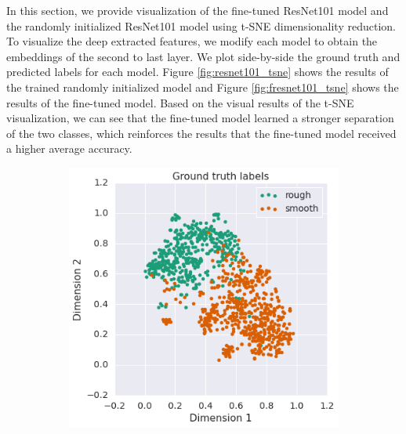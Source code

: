 \documentclass{aci}
\numberwithin{equation}{section}
\begin{document}
In this section, we provide visualization of the fine-tuned ResNet101 model and
the randomly initialized ResNet101 model using t-SNE dimensionality reduction.
To visualize the deep extracted features, we modify each model to obtain the
embeddings of the second to last layer. We plot side-by-side the ground truth
and predicted labels for each model. Figure \ref{fig:resnet101_tsne} shows the
results of the trained randomly initialized model and Figure
\ref{fig:fresnet101_tsne} shows the results of the fine-tuned model. Based on
the visual results of the t-SNE visualization, we can see that the fine-tuned
model learned a stronger separation of the two classes, which reinforces the
results that the fine-tuned model received a higher average accuracy.

\begin{figure}[h!]
    \centering
    \begin{subfigure}{.45\textwidth}
        \includegraphics[width=1\linewidth]{thesis_assets/plots/fresnet101_gt_tsne.png}
    \end{subfigure}
    \begin{subfigure}{.45\textwidth}

\end{subfigure}
\end{figure}
\end{document}
